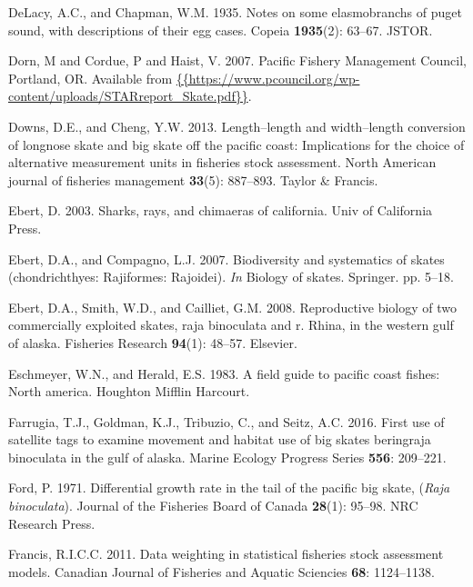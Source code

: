 \documentclass[12pt,]{article}
\begin{document}
\leavevmode\hypertarget{ref-DeLacy1935}{}%
DeLacy, A.C., and Chapman, W.M. 1935. Notes on some elasmobranchs of
puget sound, with descriptions of their egg cases. Copeia
\textbf{1935}(2): 63--67. JSTOR.

\leavevmode\hypertarget{ref-Dorn2007}{}%
Dorn, M and Cordue, P and Haist, V. 2007. Pacific Fishery Management
Council, Portland, OR. Available from
\href{\%7B\%7Bhttps://www.pcouncil.org/wp-content/uploads/STARreport_Skate.pdf\%7D\%7D}{\{\{https://www.pcouncil.org/wp-content/uploads/STARreport\_Skate.pdf\}\}}.

\leavevmode\hypertarget{ref-Downs2013}{}%
Downs, D.E., and Cheng, Y.W. 2013. Length--length and width--length
conversion of longnose skate and big skate off the pacific coast:
Implications for the choice of alternative measurement units in
fisheries stock assessment. North American journal of fisheries
management \textbf{33}(5): 887--893. Taylor \& Francis.

\leavevmode\hypertarget{ref-Ebert2003}{}%
Ebert, D. 2003. Sharks, rays, and chimaeras of california. Univ of
California Press.

\leavevmode\hypertarget{ref-Ebert2007}{}%
Ebert, D.A., and Compagno, L.J. 2007. Biodiversity and systematics of
skates (chondrichthyes: Rajiformes: Rajoidei). \emph{In} Biology of
skates. Springer. pp. 5--18.

\leavevmode\hypertarget{ref-Ebert2008}{}%
Ebert, D.A., Smith, W.D., and Cailliet, G.M. 2008. Reproductive biology
of two commercially exploited skates, raja binoculata and r. Rhina, in
the western gulf of alaska. Fisheries Research \textbf{94}(1): 48--57.
Elsevier.

\leavevmode\hypertarget{ref-Eschmeyer1983}{}%
Eschmeyer, W.N., and Herald, E.S. 1983. A field guide to pacific coast
fishes: North america. Houghton Mifflin Harcourt.

\leavevmode\hypertarget{ref-Farrugia2016}{}%
Farrugia, T.J., Goldman, K.J., Tribuzio, C., and Seitz, A.C. 2016. First
use of satellite tags to examine movement and habitat use of big skates
beringraja binoculata in the gulf of alaska. Marine Ecology Progress
Series \textbf{556}: 209--221.

\leavevmode\hypertarget{ref-Ford1971}{}%
Ford, P. 1971. Differential growth rate in the tail of the pacific big
skate, (\emph{Raja binoculata}). Journal of the Fisheries Board of
Canada \textbf{28}(1): 95--98. NRC Research Press.

\leavevmode\hypertarget{ref-Francis2011}{}%
Francis, R.I.C.C. 2011. Data weighting in statistical fisheries stock
assessment models. Canadian Journal of Fisheries and Aquatic Sciencies
\textbf{68}: 1124--1138.
\end{document}
